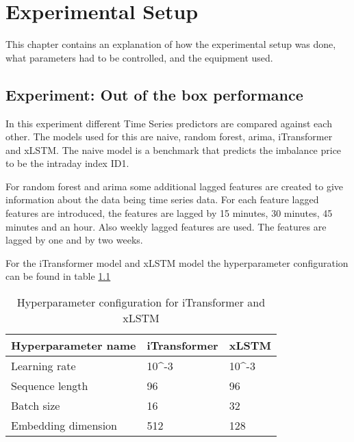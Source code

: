 \documentclass[class=scrbook, crop=false]{standalone}
\begin{document}
\chapter{Experimental Setup} %
\label{Chapter::Experimental_Setup}
   This chapter contains an explanation of how the experimental setup was done, what parameters had to be controlled, and the equipment used.

\section{Experiment: Out of the box performance}
\label{Section::Experiment_out_of_the_box}

In this experiment different Time Series predictors are compared against each other.
The models used for this are naive, random forest, arima, iTransformer and xLSTM.
The naive model is a benchmark that predicts the imbalance price to be the intraday index ID1. 

For random forest and arima some additional lagged features are created to give information about the data being time series data.
For each feature lagged features are introduced, the features are lagged by 15 minutes, 30 minutes, 45 minutes and an hour.
Also weekly lagged features are used. The features are lagged by one and by two weeks.

For the iTransformer model and xLSTM model the hyperparameter configuration can be found in table \ref{Table::raw_hyperparameters}

\begin{table}[]
\centering
\begin{tabular}{l|l|l}
 Hyperparameter name & iTransformer & xLSTM   \\\hline
 Learning rate & 10^{-3} & 10^{-3}  \\
 Sequence length & 96 & 96  \\
 Batch size & 16 & 32  \\
 Embedding dimension & 512 & 128  \\
 
\end{tabular}
\caption{Hyperparameter configuration for iTransformer and xLSTM}
\label{Table::raw_hyperparameters}
\end{table}
\end{document}
